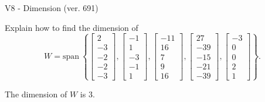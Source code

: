\begin{exercise}
  \begin{exerciseTitle}V8 - Dimension (ver. 691)\end{exerciseTitle}
  \begin{exerciseStatement}
    Explain how to find the dimension of 
\[W=\mathrm{span}\ \left\{\left[\begin{array}{r}
2 \\
-3 \\
-2 \\
-2 \\
-3
\end{array}\right] , \left[\begin{array}{r}
-1 \\
1 \\
-3 \\
-1 \\
1
\end{array}\right] , \left[\begin{array}{r}
-11 \\
16 \\
7 \\
9 \\
16
\end{array}\right] , \left[\begin{array}{r}
27 \\
-39 \\
-15 \\
-21 \\
-39
\end{array}\right] , \left[\begin{array}{r}
-3 \\
0 \\
0 \\
2 \\
1
\end{array}\right]\right\}.\]



  \end{exerciseStatement}
  \begin{exerciseAnswer}
   The dimension of \(W\) is  \(3\).
  


  \end{exerciseAnswer}
\end{exercise}